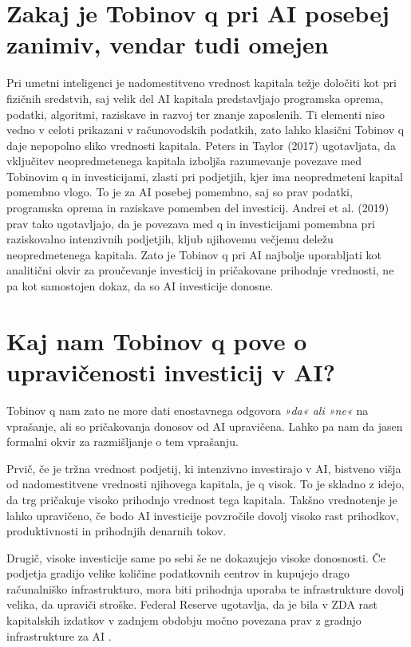 \documentclass[12pt,a4paper]{article}
\begin{document}
\section{Zakaj je Tobinov q pri AI posebej zanimiv, vendar tudi omejen}
Pri umetni inteligenci je nadomestitveno vrednost kapitala težje določiti kot pri fizičnih 
sredstvih, saj velik del AI kapitala predstavljajo programska oprema, podatki, algoritmi, 
raziskave in razvoj ter znanje zaposlenih. Ti elementi niso vedno v celoti prikazani v računovodskih 
podatkih, zato lahko klasični Tobinov q daje nepopolno sliko vrednosti kapitala.
Peters in Taylor (2017) ugotavljata, da vključitev neopredmetenega kapitala izboljša 
razumevanje povezave med Tobinovim q in investicijami, zlasti pri podjetjih, kjer ima 
neopredmeteni kapital pomembno vlogo. To je za AI posebej pomembno, saj so prav podatki, 
programska oprema in raziskave pomemben del investicij. Andrei et al. (2019) prav tako 
ugotavljajo, da je povezava med q in investicijami pomembna pri raziskovalno intenzivnih 
podjetjih, kljub njihovemu večjemu deležu neopredmetenega kapitala.
Zato je Tobinov q pri AI najbolje uporabljati kot analitični okvir za proučevanje 
investicij in pričakovane prihodnje vrednosti, ne pa kot samostojen dokaz, da so AI 
investicije donosne.

\section{Kaj nam Tobinov q pove o upravičenosti investicij v AI?}

Tobinov q nam zato ne more dati enostavnega odgovora \textit{»da« ali »ne«} na vprašanje, 
ali so pričakovanja donosov od AI upravičena. Lahko pa nam da jasen formalni okvir za 
razmišljanje o tem vprašanju.

Prvič, če je tržna vrednost podjetij, ki intenzivno investirajo v AI, bistveno višja od 
nadomestitvene vrednosti njihovega kapitala, je q visok. To je skladno z idejo, da trg 
pričakuje visoko prihodnjo vrednost tega kapitala. Takšno vrednotenje je lahko upravičeno, 
če bodo AI investicije povzročile dovolj visoko rast prihodkov, produktivnosti in prihodnjih 
denarnih tokov.

Drugič, visoke investicije same po sebi še ne dokazujejo visoke donosnosti. Če podjetja 
gradijo velike količine podatkovnih centrov in kupujejo drago računalniško infrastrukturo, 
mora biti prihodnja uporaba te infrastrukture dovolj velika, da upraviči stroške. Federal 
Reserve ugotavlja, da je bila v ZDA rast kapitalskih izdatkov v zadnjem obdobju močno 
povezana prav z gradnjo infrastrukture za AI \citep{FederalReserve2026}.
\end{document}

